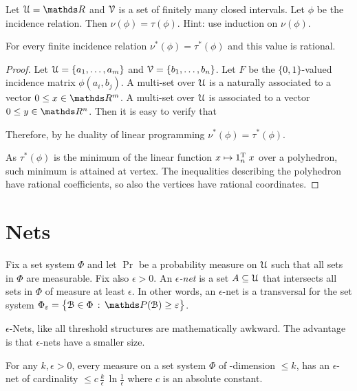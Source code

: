 \documentclass[scombinatorics.tex]{subfiles}
\begin{document}
\begin{exercise}
Let $\U=\RR$ and $\EuScript V$ is a set of finitely many closed intervals.
Let $\phi$ be the incidence relation.
Then $\nu(\phi)=\tau(\phi)$.
Hint: use induction on $\nu(\phi)$.
\end{exercise}

\begin{theorem}\label{thm_fractional_nu=tau}
For every finite incidence relation $\nu^*(\phi)=\tau^*(\phi)$ and this value is rational.
\end{theorem}
\begin{proof}
Let $\EuScript U=\{a_1,\dots,a_m\}$ and $\EuScript V=\{b_1,\dots,b_n\}$.
Let $F$ be the $\{0,1\}$-valued incidence matrix $\phi(a_i,b_j)$.
A multi-set over $\EuScript U$ is a naturally associated to a vector $0\le x\in\RR^m$.
A multi-set over $\EuScript U$ is associated to a vector $0\le y\in\RR^n$.
Then it is easy to verify that



Therefore, by he duality of linear programming $\nu^*(\phi)=\tau^*(\phi)$.

As $\tau^*(\phi)$ is the minimum of the linear function $x\mapsto 1_n^{\rm T}\;x$ over a polyhedron, such minimum is attained at vertex.
The inequalities describing the polyhedron have rational coefficients, so also the vertices have rational coordinates.
\end{proof}

\section{Nets}

Fix a set system $\Phi$ and let $\Pr$ be a probability measure on $\EuScript U$ such that all sets in $\Phi$ are measurable.
Fix also $\epsilon>0$.
An \emph{$\epsilon$-net\/} is a set $A\subseteq\EuScript U$ that intersects all sets in $\Phi$ of measure at least $\epsilon$.
In other words, an $\epsilon$-net is a transversal for the set system $\Phi_\epsilon=\big\{\B\in\Phi\,:\,\Pr(\B)\ge\epsilon\big\}$.

$\epsilon$-Nets, like all threshold structures are mathematically awkward. The advantage is that $\epsilon$-nets have a smaller size. 

\begin{proposition}\label{prop_nets}
For any $k,\epsilon>0$, every measure on a set system $\Phi$ of \vc-dimension $\le k$, has an $\epsilon$-net of cardinality $\displaystyle\le c\,\frac k\epsilon\,\ln \frac1\epsilon$ where $c$ is an absolute constant.
\end{proposition}
\end{document}
